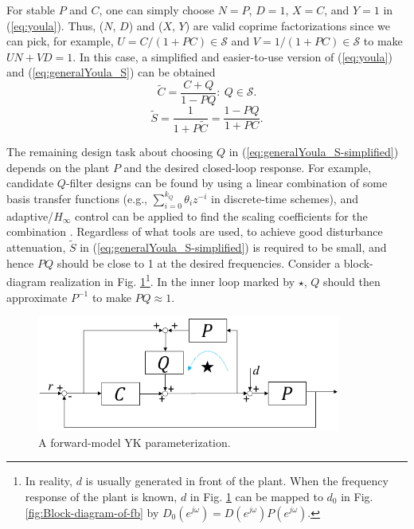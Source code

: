 \documentclass [11pt, proquest] {uwthesis}[2020/02/24]
\begin{document}
For stable $P$ and $C$, one can simply choose $N=P$, $D=1$, $X=C$,
and $Y=1$ in (\ref{eq:youla}). Thus, ($N$, $D$) and ($X$, $Y$)
are valid coprime factorizations since we can pick, for example, $U=C/(1+PC)\in\mathcal{S}$
and $V=1/(1+PC)\in\mathcal{S}$ to make $UN+VD=1$. In this case,
a simplified and easier-to-use version of (\ref{eq:youla}) and (\ref{eq:generalYoula_S})
can be obtained
\begin{equation}
\tilde{C}=\frac{C+Q}{1-PQ}:\ Q\in\mathcal{S}.\label{eq:youla-simplified}
\end{equation}
\begin{equation}
\tilde{S}=\frac{1}{1+P\tilde{C}}=\frac{1-PQ}{1+PC}.\label{eq:generalYoula_S-simplified}
\end{equation}

The remaining design task about choosing $Q$ in (\ref{eq:generalYoula_S-simplified})
depends on the plant $P$ and the desired closed-loop response. For
example, candidate $Q$-filter designs can be found by using a linear
combination of some basis transfer functions (e.g., $\sum_{i=0}^{k_{Q}}\theta_{i}z^{-i}$
in discrete-time schemes), and adaptive/$H_{\infty}$ control can
be applied to find the scaling coefficients for the combination \cite{chen2013selective}.
Regardless of what tools are used, to achieve good disturbance attenuation,
$\tilde{S}$ in (\ref{eq:generalYoula_S-simplified}) is required
to be small, and hence $PQ$ should be close to 1 at the desired frequencies.
Consider a block-diagram realization in Fig. \ref{fig:A-forward-model-Youla}\footnote{In reality, $d$ is usually generated in front of the plant. When
the frequency response of the plant is known, $d$ in Fig. \ref{fig:A-forward-model-Youla}
can be mapped to $d_{0}$ in Fig. \ref{fig:Block-diagram-of-fb}
by $D_{0}(e^{j\omega})=D(e^{j\omega})P(e^{j\omega})$.}. In the inner loop marked by $\star$, $Q$ should then approximate
$P^{-1}$ to make $PQ\approx1$.
\begin{figure}[!ht]
\begin{centering}
\includegraphics[width=10cm]{Loop-shaping/block diagram-2}
\par\end{centering}
\caption{\label{fig:A-forward-model-Youla}A forward-model YK parameterization.}
\end{figure}
\end{document}
